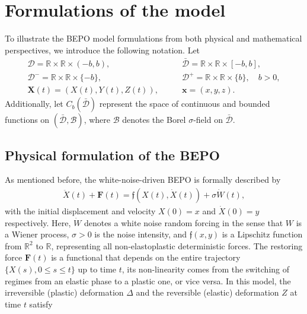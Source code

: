 \documentclass[12pt]{article}
\numberwithin{equation}{section}
\def \R{\mathbb R}
\newcommand{\D}{\mathcal{D}}
\begin{document}
\section{Formulations of the model}\label{sec:02}
To illustrate the BEPO model formulations from both physical and mathematical perspectives, 
we introduce the following notation. 
Let 
\begin{align*}
	\D = \R\times \R\times (-b,b), \hspace{4em}&\bar{\D} = \R\times \R\times [-b,b],\\
	\D^{-} = \R\times \R\times \{-b\},   \hspace{4em}&\D^{+} = \R\times \R\times \{b\},\quad b>0,\\
	\mathbf{X}(t) = (X(t), Y(t), Z(t)),   \hspace{2em}&\mathbf{x} = (x, y, z). 
\end{align*}
Additionally, let $C_{b}(\bar{\mathcal{D}})$ represent the space of continuous and bounded functions on 
$(\bar{\mathcal{D}}, \mathcal{B})$, 
where $\mathcal{B}$ denotes the Borel $\sigma$-field on $\bar{\mathcal{D}}$. 

\subsection{Physical formulation of the BEPO}\label{phys:BEPO}
As mentioned before, the white-noise-driven BEPO is formally described by 
\begin{align}
	\ddot{X}(t) + \mathbf{F}(t)
	= \mathfrak{f}(X(t),\dot{X}(t))+ \sigma \dot{W}(t), \label{bepo1}
\end{align}
with the initial displacement and velocity 
$X(0) = x$ and $\dot{X}(0) = y$ respectively. 
Here,  
$\dot{W}$ denotes a white noise random forcing in 
the sense that $W$ is a Wiener process, $\sigma>0$ is the noise intensity, and
$\mathfrak{f}(x,y)$ is a Lipschitz function from $\R^{2}$ to $\R$,  representing all non-elastoplastic deterministic forces.
The restoring force $\mathbf{F}(t)$ is a functional that depends on 
the entire trajectory $\{ X(s), 0 \leq s \leq t \}$ up to time $t$, 
its non-linearity comes from the switching of regimes from 
an elastic phase to a plastic one, or vice versa. 
In this model, the irreversible (plastic) deformation $\Delta$ and 
the reversible (elastic) deformation $Z$ at time $t$ satisfy  
\end{document}

